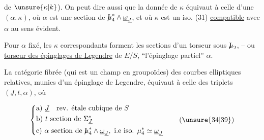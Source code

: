 de $\unsure{\kappa|k}$). On peut dire aussi que la donnée de $\kappa$ équivaut à celle d'une   $(\alpha.\,\kappa)$, où $\alpha$ est une section de $\mathord{\mathrm{I}\mkern-7mu\mu}_4^*\wedge\underline\omega_{\underline J}$, et où $\kappa$ est un iso. (31) \uline{compatible} avec $\alpha$ au sens évident.

Pour $\alpha$ fixé, les $\kappa$ correspondants forment les sections d'un torseur sous $\mathord{\mathrm{I}\mkern-7mu\mu}_2$, -- ou \uline{torseur des épinglages de Legendre} de $E/S$,   ``l'épinglage partiel'' $\alpha$.

La catégorie  fibrée (qui est un champ en groupoïdes) des courbes elliptiques relatives, munies d'un épinglage de Legendre, équivaut à celle des triplets $(\underline J,t,\alpha)$, où

\[
\left\{\begin{aligned}
&\text{a) }\underline J\quad\text{rev. étale cubique de }S\\
&\text{b) }t\ \text{section de }\Sigma_{\underline J}^*\\
&\text{c) }\alpha\ \text{section de }\mathord{\mathrm{I}\mkern-7mu\mu}_4^*\wedge\underline\omega_{\underline J},\ \text{i.e iso. }\mu_4^*\simeq\underline\omega_{\underline J}
\end{aligned}\right.
\tag*{(\unsure{34|39})}
\]

